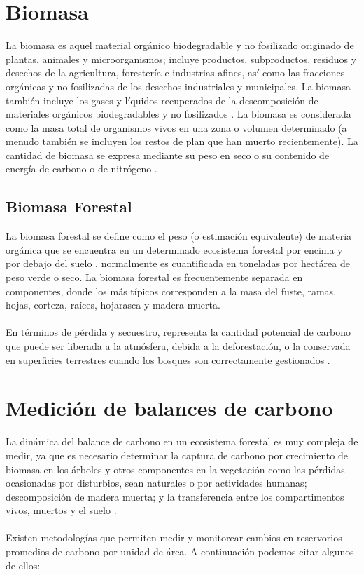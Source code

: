 \section{Biomasa}
La biomasa es aquel material org\'anico biodegradable y no fosilizado originado de plantas, animales y microorganismos; incluye productos, subproductos, residuos y desechos de la agricultura, forester\'ia e industrias afines, as\'i como las fracciones org\'anicas y no fosilizadas de los desechos industriales y municipales. La biomasa tambi\'en incluye los gases y l\'iquidos recuperados de la descomposici\'on de materiales org\'anicos biodegradables y no fosilizados \cite{salinas2008guia}.
La biomasa es considerada como la masa total de organismos vivos en una zona o volumen determinado (a menudo también se incluyen los restos de plan que han muerto recientemente). La cantidad de biomasa se expresa mediante su peso en seco o su contenido de energ\'ia de carbono o de nitr\'ogeno \cite{garciduenas1987produccion}.
\subsection{Biomasa Forestal}
La biomasa forestal se define como el peso (o estimaci\'on equivalente) de materia org\'anica que
se encuentra en un determinado ecosistema forestal por encima y por debajo del suelo \cite{schlegel2000manual}, normalmente es
cuantificada en toneladas por hect\'area de peso verde o seco. La biomasa forestal es frecuentemente separada en
componentes, donde los m\'as t\'ipicos corresponden a la masa del fuste, ramas, hojas, corteza,
ra\'ices, hojarasca y madera muerta. \\~\\
En t\'erminos de p\'erdida y secuestro, representa la cantidad potencial de carbono que puede ser liberada a la atm\'osfera, debida a la deforestaci\'on, o la conservada en superficies terrestres cuando los bosques son correctamente gestionados \cite{lu2005exploring}.

\section{Medici\'on de balances de carbono}
La din\'amica del balance de carbono en un ecosistema forestal es muy compleja de medir, ya que es necesario determinar la captura de carbono por crecimiento de biomasa en los \'arboles y otros componentes en la vegetaci\'on como las p\'erdidas ocasionadas por disturbios, sean naturales o por actividades humanas; descomposici\'on de madera muerta; y la transferencia entre los compartimentos vivos, muertos y el suelo \cite{angelsen2008moving}.\\~\\
Existen metodolog\'ias que permiten medir y monitorear cambios en reservorios promedios de carbono por unidad de \'area. A continuaci\'on podemos citar algunos de ellos:

